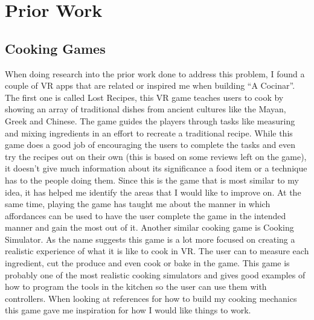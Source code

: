 \documentclass[10pt,twocolumn]{article}
\begin{document}
\section{Prior Work}
\subsection{Cooking Games}
When doing research into the prior work done to address this problem, I found a couple of VR apps that are related or inspired me when building “A Cocinar”. The first one is called Lost Recipes\cite{lostrecipes2022}, this VR game teaches users to cook by showing an array of traditional dishes from ancient cultures like the Mayan, Greek and Chinese. The game guides the players through tasks like measuring and mixing ingredients in an effort to recreate a traditional recipe. While this game does a good job of encouraging the users to complete the tasks and even try the recipes out on their own (this is based on some reviews left on the game), it doesn’t give much information about its significance a food item or a technique has to the people doing them. Since this is the game that is most similar to my idea, it has helped me identify the areas that I would like to improve on. At the same time, playing the game has taught me about the manner in which affordances can be used to have the user complete the game in the intended manner and gain the most out of it. Another similar cooking game is Cooking Simulator\cite{cookingsim2019}. As the name suggests this game is a lot more focused on creating a realistic experience of what it is like to cook in VR. The user can to measure each ingredient, cut the produce and even cook or bake in the game. This game is probably one of the most realistic cooking simulators and gives good examples of how to program the tools in the kitchen so the user can use them with controllers. When looking at references for how to build my cooking mechanics this game gave me inspiration for how I would like things to work. 
\end{document}
